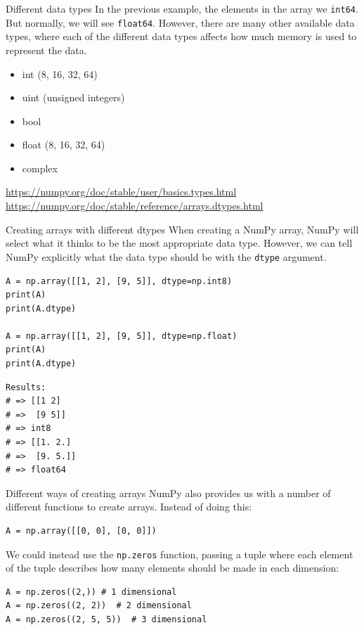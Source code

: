 \documentclass[10pt]{beamer}
\begin{document}
\begin{frame}[label={sec:orgc4c3d04},fragile]{Different data types}
 In the previous example, the elements in the array we \texttt{int64}. But normally, we will
see \texttt{float64}. However, there are many other available data types, where each of the
different data types affects how much memory is used to represent the data.

\begin{itemize}
\item int (8, 16, 32, 64)
\item uint (unsigned integers)
\item bool
\item float (8, 16, 32, 64)
\item complex
\end{itemize}

\url{https://numpy.org/doc/stable/user/basics.types.html}
\url{https://numpy.org/doc/stable/reference/arrays.dtypes.html}
\end{frame}

\begin{frame}[label={sec:org990d888},fragile]{Creating arrays with different dtypes}
 When creating a NumPy array, NumPy will select what it thinks to be the most
appropriate data type. However, we can tell NumPy explicitly what the data type
should be with the \texttt{dtype} argument.

\begin{verbatim}
A = np.array([[1, 2], [9, 5]], dtype=np.int8)
print(A)
print(A.dtype)

A = np.array([[1, 2], [9, 5]], dtype=np.float)
print(A)
print(A.dtype)
\end{verbatim}

\begin{verbatim}
Results: 
# => [[1 2]
# =>  [9 5]]
# => int8
# => [[1. 2.]
# =>  [9. 5.]]
# => float64
\end{verbatim}
\end{frame}

\begin{frame}[label={sec:org02e172c},fragile]{Different ways of creating arrays}
 NumPy also provides us with a number of different functions to create arrays. Instead
of doing this:

\begin{verbatim}
A = np.array([[0, 0], [0, 0]])
\end{verbatim}

We could instead use the \texttt{np.zeros} function, passing a tuple where each element of
the tuple describes how many elements should be made in each dimension:

\begin{verbatim}
A = np.zeros((2,)) # 1 dimensional
A = np.zeros((2, 2))  # 2 dimensional
A = np.zeros((2, 5, 5))  # 3 dimensional
\end{verbatim}
\end{frame}
\end{document}
